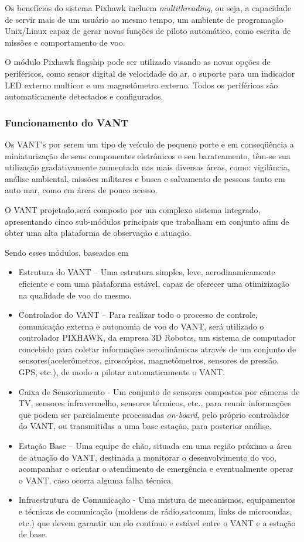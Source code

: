 Os benefícios do sistema Pixhawk incluem \textit{multithreading}, ou seja, a capacidade de servir mais de um usuário ao 
mesmo tempo, um ambiente de programação Unix/Linux capaz de gerar novas funções de piloto automático, como 
escrita de missões e comportamento de voo. \cite{pix}
 
O módulo Pixhawk flagship pode ser utilizado visando as novas opções de periféricos, como sensor digital de velocidade do ar, o suporte para um indicador LED externo multicor e um magnetômetro externo. Todos os periféricos são automaticamente detectados e configurados. \cite{pix}

\subsubsection{Funcionamento do VANT}

Os VANT's por serem um tipo de veículo de pequeno porte e em conseqüência a miniaturização de seus componentes eletrônicos e seu barateamento, têm-se sua utilização gradativamente aumentada nas mais diversas áreas, como: vigilância, análise ambiental, missões militares e busca e salvamento de pessoas tanto em auto mar, como em áreas de pouco acesso. \cite{Branco}

O VANT projetado,será composto por um complexo sistema integrado, apresentando cinco sub-módulos principais  que trabalham em conjunto afim de obter uma alta plataforma de observação e atuação.

Sendo esses módulos, baseados em \cite{pastor}

\begin{itemize}
	\item Estrutura do VANT – Uma estrutura simples, leve, aerodinamicamente eficiente e com uma plataforma estável, capaz de oferecer uma otimizização na qualidade de voo do mesmo. 
	\item Controlador do VANT – Para realizar todo o processo de controle, comunicação externa e autonomia de voo do VANT, será utilizado o controlador PIXHAWK, da empresa 3D Robotcs, um sistema de computador concebido para coletar informações aerodinâmicas através de um conjunto de sensores(acelerômetros, giroscópios, magnetômetros, sensores de pressão, GPS, etc.), de modo a pilotar automaticamente o VANT.
	\item Caixa de Sensoriamento - Um conjunto de sensores compostos por câmeras de TV, sensores infravermelho, sensores térmicos, etc., para reunir informações que podem ser parcialmente processadas \textit{on-board}, pelo próprio controlador do VANT, ou transmitidas a uma base estação, para posterior análise.
	\item Estação Base – Uma equipe de chão, situada em uma região próxima a área de atuação do VANT, destinada a monitorar o desenvolvimento do voo, acompanhar e orientar o atendimento de emergência e eventualmente operar o VANT, caso ocorra alguma falha técnica. 
	\item Infraestrutura de Comunicação - Uma mistura de mecanismos, equipamentos e técnicas de comunicação (moldens de rádio,satcomm, links de microondas, etc.) que devem garantir um elo contínuo e estável entre o VANT e a estação de base. 
\end{itemize}


